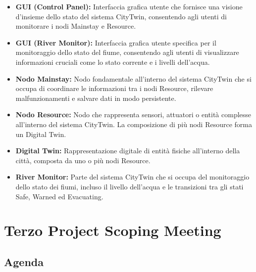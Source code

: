 \begin{itemize}
    \item \textbf{GUI (Control Panel):} Interfaccia grafica utente che fornisce una visione d'insieme dello stato del sistema CityTwin, consentendo agli utenti di monitorare i nodi Mainstay e Resource.

    \item \textbf{GUI (River Monitor):} Interfaccia grafica utente specifica per il monitoraggio dello stato del fiume, consentendo agli utenti di visualizzare informazioni cruciali come lo stato corrente e i livelli dell'acqua.

    \item \textbf{Nodo Mainstay:} Nodo fondamentale all'interno del sistema CityTwin che si occupa di coordinare le informazioni tra i nodi Resource, rilevare malfunzionamenti e salvare dati in modo persistente.

    \item \textbf{Nodo Resource:} Nodo che rappresenta sensori, attuatori o entità complesse all'interno del sistema CityTwin. La composizione di più nodi Resource forma un Digital Twin.

    \item \textbf{Digital Twin:} Rappresentazione digitale di entità fisiche all'interno della città, composta da uno o più nodi Resource.

    \item \textbf{River Monitor:} Parte del sistema CityTwin che si occupa del monitoraggio dello stato dei fiumi, incluso il livello dell'acqua e le transizioni tra gli stati Safe, Warned ed Evacuating.

\end{itemize}

\section{Terzo Project Scoping Meeting}

\subsection{Agenda}


